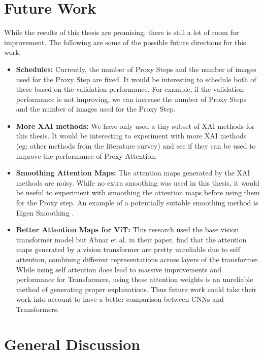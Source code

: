 \documentclass[a4paper,11pt,openright]{book}
\begin{document}
\section{Future Work}
While the results of this thesis are promising, there is still a lot of room for improvement. The following are some of the possible future directions for this work:
\begin{itemize}
    \item \textbf{Schedules:} Currently, the number of Proxy Steps and the number of images used for the Proxy Step are fixed. It would be interesting to schedule both of these based on the validation performance. For example, if the validation performance is not improving, we can increase the number of Proxy Steps and the number of images used for the Proxy Step.
    \item \textbf{More XAI methods:} We have only used a tiny subset of XAI methods for this thesis. It would be interesting to experiment with more XAI methods (eg: other methods from the literature survey) and see if they can be used to improve the performance of Proxy Attention.
    \item \textbf{Smoothing Attention Maps:} The attention maps generated by the XAI methods are noisy. While no extra smoothing was used in this thesis, it would be useful to experiment with smoothing the attention maps before using them for the Proxy step. An example of a potentially suitable smoothing method is Eigen Smoothing \cite{jacobPyTorchLibraryCAM2021}.
    \item \textbf{Better Attention Maps for ViT:} This research used the base vision transformer model but Abnar et al. \cite{abnarQuantifyingAttentionFlow2020} in their paper, find that the attention maps generated by a vision transformer are pretty unreliable due to self attention, combining different representations across layers of the transformer. While using self attention does lead to massive improvements and performance for Transformers, using these attention weights is an unreliable method of generating proper explanations. Thus future work could take their work into account to have a better comparison between CNNs and Transformers.
\end{itemize}

\section{General Discussion} 
\end{document}
